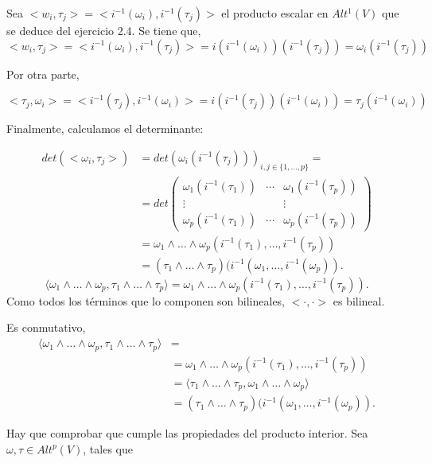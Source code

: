 \documentclass{article}
\newenvironment{itemize*}%
  {\vspace*{-0mm}
   \begin{itemize}%
    \setlength{\itemsep}{0pt}%
    \setlength{\parskip}{0pt}}%
  {\vspace*{-0mm}
   \end{itemize}}
\begin{document}
\begin{itemize*}
\item Sea $<w_i,\tau_j>=<i^{-1}(\omega_i),i^{-1}(\tau_j)>$ el producto escalar en $Alt^1(V)$ que se deduce del ejercicio 2.4. Se tiene que,
$$<w_i,\tau_j>=<i^{-1}(\omega_i),i^{-1}(\tau_j)> = i(i^{-1}(\omega_i))(i^{-1}(\tau_j))=\omega_i(i^{-1}(\tau_j))$$

Por otra parte, 

$$<\tau_j,\omega_i>=<i^{-1}(\tau_j),i^{-1}(\omega_i)> = i(i^{-1}(\tau_j))(i^{-1}(\omega_i))=\tau_j(i^{-1}(\omega_i))$$

Finalmente, calculamos el determinante:

\begin{equation}
  \begin{split}
    det(<\omega_i,\tau_j>)&=det(\omega_i(i^{-1}(\tau_j)))_{i,j\in \{1,\dots,p\}}= \\
    &= det \left( \begin{array}{ccc}
                    \omega_1(i^{-1}(\tau_1)) & \cdots & \omega_1(i^{-1}(\tau_p)) \\
                    \vdots &  & \vdots \\
                    \omega_p(i^{-1}(\tau_1)) & \cdots  & \omega_p(i^{-1}(\tau_p)) \end{array} \right) \\
                &= \omega_1\wedge \dots \wedge \omega_p (i^{-1}(\tau_1),\dots , i^{-1}(\tau_p)) \\
                &= (\tau_1\wedge \dots \wedge \tau_p)(i^{-1}(\omega_1,\dots,i^{-1}(\omega_p)).
  \end{split}
\end{equation}
$$   \langle  \omega_1\wedge \dots \wedge \omega_p,\tau_1\wedge \dots \wedge \tau_p \rangle = \omega_1\wedge \dots \wedge \omega_p(i^{-1}(\tau_1),\dots,i^{-1}(\tau_p)).$$
Como todos los términos que lo componen son bilineales, $<\cdot,\cdot>$ es bilineal. 
\item Es conmutativo,
  \begin{equation}
    \begin{split}
      \langle  \omega_1\wedge \dots \wedge \omega_p,\tau_1\wedge \dots \wedge \tau_p \rangle &= \\
      &=  \omega_1\wedge \dots \wedge \omega_p (i^{-1}(\tau_1),\dots , i^{-1}(\tau_p)) \\
      &= \langle  \tau_1\wedge \dots \wedge \tau_p,\omega_1\wedge \dots \wedge \omega_p \rangle  \\
      &= (\tau_1\wedge \dots \wedge \tau_p)(i^{-1}(\omega_1,\dots,i^{-1}(\omega_p)).
    \end{split}
  \end{equation}
\item Hay que comprobar que cumple las propiedades del producto interior.
  Sea $\omega,\tau \in Alt^p(V)$, tales que


\end{itemize*}
\end{document}
